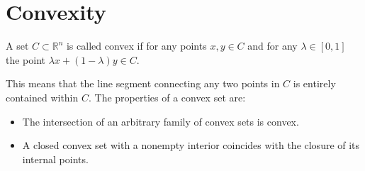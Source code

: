 \section{Convexity}

\begin{definition}
    A set $C \subset \mathbb{R}^n$ is called convex if for any points $x, y \in C$ and for any $\lambda \in [0, 1]$ the point $\lambda x + (1 - \lambda)y \in C$.
\end{definition}
This means that the line segment connecting any two points in $C$ is entirely contained within $C$.
The properties of a convex set are:
\begin{itemize}
    \item The intersection of an arbitrary family of convex sets is convex.
    \item A closed convex set with a nonempty interior coincides with the closure of its internal points.
\end{itemize}

